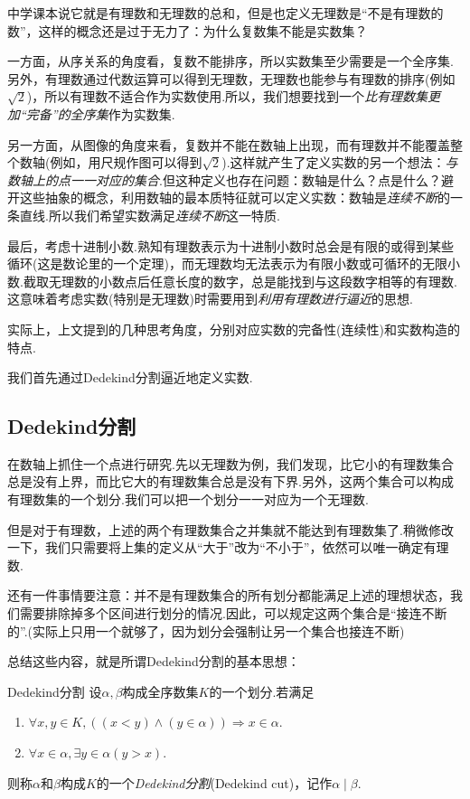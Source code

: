 中学课本说它就是有理数和无理数的总和，但是也定义无理数是“不是有理数的数”，这样的概念还是过于无力了：为什么复数集不能是实数集？

一方面，从序关系的角度看，复数不能排序，所以实数集至少需要是一个全序集.另外，有理数通过代数运算可以得到无理数，无理数也能参与有理数的排序(例如$\sqrt{2}$)，所以有理数不适合作为实数使用.所以，我们想要找到一个\textit{比有理数集更加“完备”的全序集}作为实数集.

另一方面，从图像的角度来看，复数并不能在数轴上出现，而有理数并不能覆盖整个数轴(例如，用尺规作图可以得到$\sqrt{2}$).这样就产生了定义实数的另一个想法：\textit{与数轴上的点一一对应的集合}.但这种定义也存在问题：数轴是什么？点是什么？避开这些抽象的概念，利用数轴的最本质特征就可以定义实数：数轴是\textit{连续不断}的一条直线.所以我们希望实数满足\textit{连续不断}这一特质.

最后，考虑十进制小数.熟知有理数表示为十进制小数时总会是有限的或得到某些循环(这是数论里的一个定理)，而无理数均无法表示为有限小数或可循环的无限小数.截取无理数的小数点后任意长度的数字，总是能找到与这段数字相等的有理数.这意味着考虑实数(特别是无理数)时需要用到\textit{利用有理数进行逼近}的思想.

实际上，上文提到的几种思考角度，分别对应实数的完备性(连续性)和实数构造的特点.

我们首先通过Dedekind分割逼近地定义实数.

\subsection{Dedekind分割}

在数轴上抓住一个点进行研究.先以无理数为例，我们发现，比它小的有理数集合总是没有上界，而比它大的有理数集合总是没有下界.另外，这两个集合可以构成有理数集的一个划分.我们可以把一个划分一一对应为一个无理数.

但是对于有理数，上述的两个有理数集合之并集就不能达到有理数集了.稍微修改一下，我们只需要将上集的定义从“大于”改为“不小于”，依然可以唯一确定有理数.

还有一件事情要注意：并不是有理数集合的所有划分都能满足上述的理想状态，我们需要排除掉多个区间进行划分的情况.因此，可以规定这两个集合是“接连不断的”.(实际上只用一个就够了，因为划分会强制让另一个集合也接连不断)

总结这些内容，就是所谓Dedekind分割的基本思想：

\begin{definition}{Dedekind分割}
	设$\alpha ,\beta$构成全序数集$K$的一个划分.若满足
	\begin{enumerate}
		\item $\forall x,y \in K,((x < y) \wedge (y \in \alpha)) \Rightarrow x \in \alpha$.
		\item $\forall x \in \alpha ,\exists y \in \alpha (y>x)$.
	\end{enumerate}
	则称$\alpha$和$\beta$构成$K$的一个\textit{Dedekind分割}(Dedekind cut)，记作$\alpha \mid \beta$.
\end{definition}

